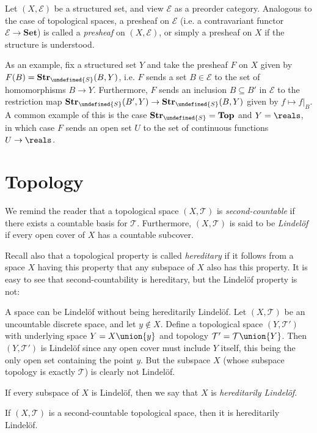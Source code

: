 \documentclass[article, a4paper, 11pt, oneside]{memoir}
\let\mathfrak\undefined
\numberwithin{equation}{chapter}
\newcommand{\calT}{\mathcal{T}}
\newcommand{\calE}{\mathcal{E}}
\newcommand{\strucS}{\mathfrak{S}}
\newcommand{\ncat}[1]{\mathbf{#1}} %
\newcommand{\catSet}{\ncat{Set}} %
\newcommand{\catTop}{\ncat{Top}} %
\newcommand{\catStruc}[1]{\ncat{Str}_{#1}} %
\newcommand{\catStrucS}{\catStruc{\strucS}} %
\begin{document}
Let $(X, \calE)$ be a structured set, and view $\calE$ as a preorder category. Analogous to the case of topological spaces, a presheaf on $\calE$ (i.e. a contravariant functor $\calE \to \catSet$) is called a \emph{presheaf} on $(X, \calE)$, or simply a presheaf on $X$ if the structure is understood.

As an example, fix a structured set $Y$ and take the presheaf $F$ on $X$ given by $F(B) = \catStrucS(B,Y)$, i.e. $F$ sends a set $B \in \calE$ to the set of homomorphisms $B \to Y$. Furthermore, $F$ sends an inclusion $B \subseteq B'$ in $\calE$ to the restriction map $\catStrucS(B',Y) \to \catStrucS(B,Y)$ given by $f \mapsto f|_B$. A common example of this is the case $\catStrucS = \catTop$ and $Y = \reals$, in which case $F$ sends an open set $U$ to the set of continuous functions $U \to \reals$.



\chapter{Topology}

We remind the reader that a topological space $(X, \calT)$ is \emph{second-countable} if there exists a countable basis for $\calT$. Furthermore, $(X, \calT)$ is said to be \emph{Lindelöf} if every open cover of $X$ has a countable subcover.

Recall also that a topological property is called \emph{hereditary} if it follows from a space $X$ having this property that any subspace of $X$ also has this property. It is easy to see that second-countability is hereditary, but the Lindelöf property is not:

\begin{remark}
    A space can be Lindelöf without being hereditarily Lindelöf. Let $(X, \calT)$ be an uncountable discrete space, and let $y \not\in X$. Define a topological space $(Y, \calT')$ with underlying space $ Y = X \union \{y\}$ and topology $\calT' = \calT \union \{Y\}$. Then $(Y, \calT')$ is Lindelöf since any open cover must include $Y$ itself, this being the only open set containing the point $y$. But the subspace $X$ (whose subspace topology is exactly $\calT$) is clearly not Lindelöf.
\end{remark}
%
If every subspace of $X$ is Lindelöf, then we say that $X$ is \emph{hereditarily Lindelöf}.

\begin{proposition}
    If $(X,\calT)$ is a second-countable topological space, then it is hereditarily Lindelöf.
\end{proposition}
\end{document}
